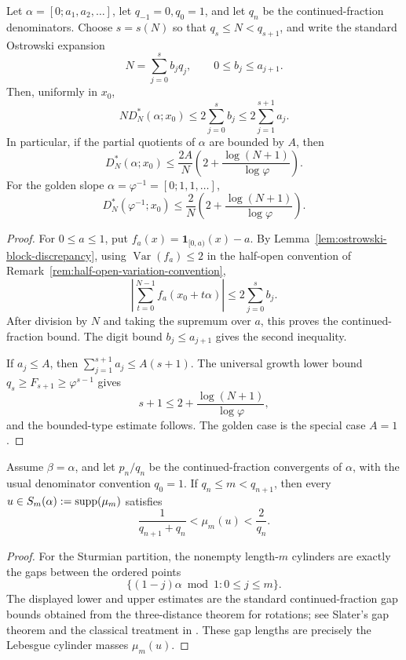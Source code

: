 \begin{proposition}\label{prop:rotation-discrepancy-cf-rate}
Let \(\alpha=[0;a_1,a_2,\dots]\), let \(q_{-1}=0,q_0=1\), and let
\(q_n\) be the continued-fraction denominators.  Choose \(s=s(N)\) so that
\(q_s\le N<q_{s+1}\), and write the standard Ostrowski expansion
\cite[Ch.~I, Sec.~4]{Cassels1957}
\[
N=\sum_{j=0}^s b_jq_j,\qquad 0\le b_j\le a_{j+1}.
\]
Then, uniformly in \(x_0\),
\[
N D_N^*(\alpha;x_0)\le 2\sum_{j=0}^s b_j
\le 2\sum_{j=1}^{s+1}a_j .
\]
In particular, if the partial quotients of \(\alpha\) are bounded by \(A\),
then
\[
D_N^*(\alpha;x_0)
\le
\frac{2A}{N}
\left(2+\frac{\log(N+1)}{\log\varphi}\right).
\]
For the golden slope \(\alpha=\varphi^{-1}=[0;1,1,\dots]\),
\[
D_N^*(\varphi^{-1};x_0)
\le
\frac{2}{N}
\left(2+\frac{\log(N+1)}{\log\varphi}\right).
\]
\end{proposition}

\begin{proof}
For \(0\le a\le1\), put \(f_a(x)=\mathbf{1}_{[0,a)}(x)-a\).  By
Lemma~\ref{lem:ostrowski-block-discrepancy}, using
\(\operatorname{Var}(f_a)\le2\) in the half-open convention of
Remark~\ref{rem:half-open-variation-convention},
\[
\left|\sum_{t=0}^{N-1}f_a(x_0+t\alpha)\right|
\le 2\sum_{j=0}^s b_j .
\]
After division by \(N\) and taking the supremum over \(a\), this proves the
continued-fraction bound.  The digit bound \(b_j\le a_{j+1}\) gives the second
inequality.

If \(a_j\le A\), then \(\sum_{j=1}^{s+1}a_j\le A(s+1)\).  The universal
growth lower bound \(q_s\ge F_{s+1}\ge \varphi^{s-1}\) gives
\[
s+1\le 2+\frac{\log(N+1)}{\log\varphi},
\]
and the bounded-type estimate follows.  The golden case is the special case
\(A=1\).
\end{proof}

\begin{proposition}\label{thm:spg-sturmian-cylinder-measure-continued-fraction-sandwich}
Assume \(\beta=\alpha\), and let \(p_n/q_n\) be the continued-fraction
convergents of \(\alpha\), with the usual denominator convention
\(q_0=1\). If \(q_n\le m<q_{n+1}\), then every
\(u\in S_m(\alpha):=\operatorname{supp}(\mu_m)\) satisfies
\[
\frac{1}{q_{n+1}+q_n}<\mu_m(u)<\frac{2}{q_n}.
\]
\end{proposition}

\begin{proof}
For the Sturmian partition, the nonempty length-\(m\) cylinders are exactly the
gaps between the ordered points
\[
\{(1-j)\alpha\bmod 1:0\le j\le m\}.
\]
The displayed lower and upper estimates are the standard continued-fraction
gap bounds obtained from the three-distance theorem for rotations; see
Slater's gap theorem \cite{Slater1967GapsSteps} and the classical treatment in
\cite[Chapter~2]{KuipersNiederreiter1974}. These gap lengths are precisely the
Lebesgue cylinder masses \(\mu_m(u)\).
\end{proof}
